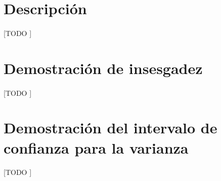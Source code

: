 \documentclass{article}
\begin{document}
	\maketitle
  \thispagestyle{empty}


  \section{Descripción}
  \label{sec:description}

    \paragraph{}
    [TODO ]

  \section{Demostración de insesgadez}
  \label{sec:demostration_1}

    \paragraph{}
    [TODO ]

  \section{Demostración del intervalo de confianza para la varianza}
  \label{sec:demostration_1}

    \paragraph{}
    [TODO ]

	\nocite{muest2017}

  
  
\end{document}
